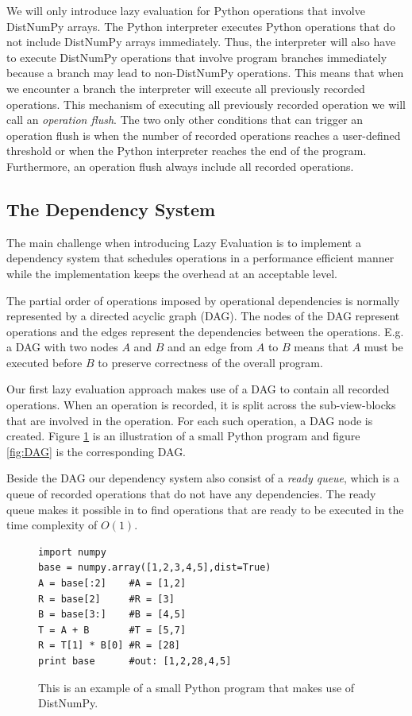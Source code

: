 \documentclass{acm_proc_article-sp}
\begin{document}
We will only introduce lazy evaluation for Python operations that involve DistNumPy arrays. The Python interpreter executes Python operations that do not include DistNumPy arrays immediately. Thus, the interpreter will also have to execute DistNumPy operations that involve program branches immediately because a branch may lead to non-DistNumPy operations. This means that when we encounter a branch the interpreter will execute all previously recorded operations. This mechanism of executing all previously recorded operation we will call an \emph{operation flush}. The two only other conditions that can trigger an operation flush is when the number of recorded operations reaches a user-defined threshold or when the Python interpreter reaches the end of the program. Furthermore, an operation flush always include all recorded operations.


\subsection{The Dependency System}
The main challenge when introducing Lazy Evaluation is to implement a dependency system that schedules operations in a performance efficient manner while the implementation keeps the overhead at an acceptable level.

The partial order of operations imposed by operational dependencies is normally represented by a directed acyclic graph (DAG)\cite{AhSeUl86}. The nodes of the DAG represent operations and the edges represent the dependencies between the operations. E.g. a DAG with two nodes $A$ and $B$ and an edge from $A$ to $B$ means that $A$ must be executed before $B$ to preserve correctness of the overall program. 

Our first lazy evaluation approach makes use of a DAG to contain all recorded operations. When an operation is recorded, it is split across the sub-view-blocks that are involved in the operation. For each such operation, a DAG node is created. Figure \ref{lst:code_eg}  is an illustration of a small Python program and figure \ref{fig:DAG} is the corresponding DAG.
 
Beside the DAG our dependency system also consist of a \emph{ready queue}, which is a queue of recorded operations that do not have any dependencies. The ready queue makes it possible in to find operations that are ready to be executed in the time complexity of $O(1)$.

\begin{figure}
\begin{lstlisting}
import numpy
base = numpy.array([1,2,3,4,5],dist=True)
A = base[:2]    #A = [1,2]
R = base[2]     #R = [3]
B = base[3:]    #B = [4,5]
T = A + B       #T = [5,7]
R = T[1] * B[0] #R = [28]
print base      #out: [1,2,28,4,5]
\end{lstlisting}
 \caption{This is an example of a small Python program that makes use of DistNumPy.}
 \label{lst:code_eg}
\end{figure}
\end{document}
